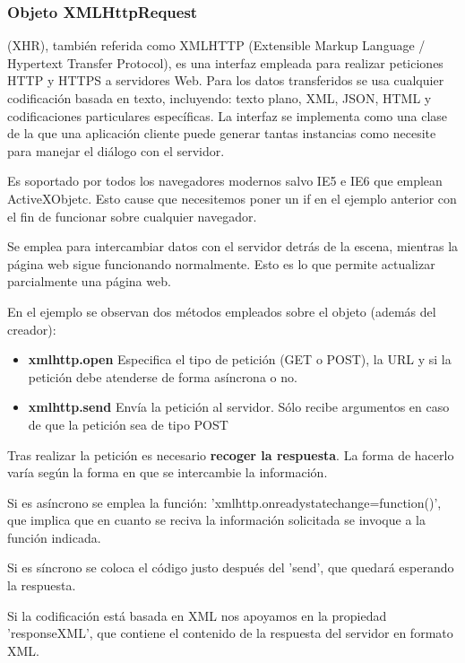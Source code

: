 \documentclass{apuntes}
\begin{document}
\subsubsection{Objeto XMLHttpRequest}
\begin{defn}
(XHR), también referida como XMLHTTP (Extensible Markup Language / Hypertext Transfer Protocol), es una interfaz empleada para realizar peticiones HTTP y HTTPS a servidores Web. Para los datos transferidos se usa cualquier codificación basada en texto, incluyendo: texto plano, XML, JSON, HTML y codificaciones particulares específicas. La interfaz se implementa como una clase de la que una aplicación cliente puede generar tantas instancias como necesite para manejar el diálogo con el servidor.
\end{defn}
Es soportado por todos los navegadores modernos salvo IE5 e IE6 que emplean ActiveXObjetc. Esto cause que necesitemos poner un if en el ejemplo anterior con el fin de funcionar sobre cualquier navegador.

Se emplea para intercambiar datos con el servidor detrás de la escena, mientras la página web sigue funcionando normalmente. Esto es lo que permite actualizar parcialmente una página web.

En el ejemplo se observan dos métodos empleados sobre el objeto (además del creador):
\begin{itemize}
\item \textbf{xmlhttp.open}
Especifica el tipo de petición (GET o POST), la URL y si la petición debe atenderse de forma asíncrona o no.
\item \textbf{xmlhttp.send}
Envía la petición al servidor. Sólo recibe argumentos en caso de que la petición sea de tipo POST
\end{itemize}

Tras realizar la petición es necesario \textbf{recoger la respuesta}. La forma de hacerlo varía según la forma en que se intercambie la información.

Si es asíncrono se emplea la función: 'xmlhttp.onreadystatechange=function()', que implica que en cuanto se reciva la información solicitada se invoque a la función indicada.

Si es síncrono se coloca el código justo después del 'send', que quedará esperando la respuesta.

Si la codificación está basada en XML nos apoyamos en la propiedad 'responseXML', que contiene el contenido de la respuesta del servidor en formato XML.
\end{document}

